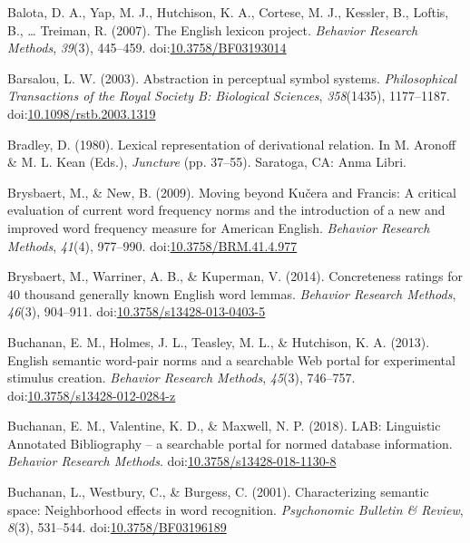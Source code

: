 \documentclass[english,,man]{apa6}
\begin{document}
\leavevmode\hypertarget{ref-Balota2007}{}%
Balota, D. A., Yap, M. J., Hutchison, K. A., Cortese, M. J., Kessler, B., Loftis, B., \ldots{} Treiman, R. (2007). The English lexicon project. \emph{Behavior Research Methods}, \emph{39}(3), 445--459. doi:\href{https://doi.org/10.3758/BF03193014}{10.3758/BF03193014}

\leavevmode\hypertarget{ref-Barsalou2003}{}%
Barsalou, L. W. (2003). Abstraction in perceptual symbol systems. \emph{Philosophical Transactions of the Royal Society B: Biological Sciences}, \emph{358}(1435), 1177--1187. doi:\href{https://doi.org/10.1098/rstb.2003.1319}{10.1098/rstb.2003.1319}

\leavevmode\hypertarget{ref-Bradley1980}{}%
Bradley, D. (1980). Lexical representation of derivational relation. In M. Aronoff \& M. L. Kean (Eds.), \emph{Juncture} (pp. 37--55). Saratoga, CA: Anma Libri.

\leavevmode\hypertarget{ref-Brysbaert2009}{}%
Brysbaert, M., \& New, B. (2009). Moving beyond Kučera and Francis: A critical evaluation of current word frequency norms and the introduction of a new and improved word frequency measure for American English. \emph{Behavior Research Methods}, \emph{41}(4), 977--990. doi:\href{https://doi.org/10.3758/BRM.41.4.977}{10.3758/BRM.41.4.977}

\leavevmode\hypertarget{ref-Brysbaert2013}{}%
Brysbaert, M., Warriner, A. B., \& Kuperman, V. (2014). Concreteness ratings for 40 thousand generally known English word lemmas. \emph{Behavior Research Methods}, \emph{46}(3), 904--911. doi:\href{https://doi.org/10.3758/s13428-013-0403-5}{10.3758/s13428-013-0403-5}

\leavevmode\hypertarget{ref-Buchanan2013}{}%
Buchanan, E. M., Holmes, J. L., Teasley, M. L., \& Hutchison, K. A. (2013). English semantic word-pair norms and a searchable Web portal for experimental stimulus creation. \emph{Behavior Research Methods}, \emph{45}(3), 746--757. doi:\href{https://doi.org/10.3758/s13428-012-0284-z}{10.3758/s13428-012-0284-z}

\leavevmode\hypertarget{ref-Buchanan2018}{}%
Buchanan, E. M., Valentine, K. D., \& Maxwell, N. P. (2018). LAB: Linguistic Annotated Bibliography -- a searchable portal for normed database information. \emph{Behavior Research Methods}. doi:\href{https://doi.org/10.3758/s13428-018-1130-8}{10.3758/s13428-018-1130-8}

\leavevmode\hypertarget{ref-Buchanan2001}{}%
Buchanan, L., Westbury, C., \& Burgess, C. (2001). Characterizing semantic space: Neighborhood effects in word recognition. \emph{Psychonomic Bulletin \& Review}, \emph{8}(3), 531--544. doi:\href{https://doi.org/10.3758/BF03196189}{10.3758/BF03196189}
\end{document}
